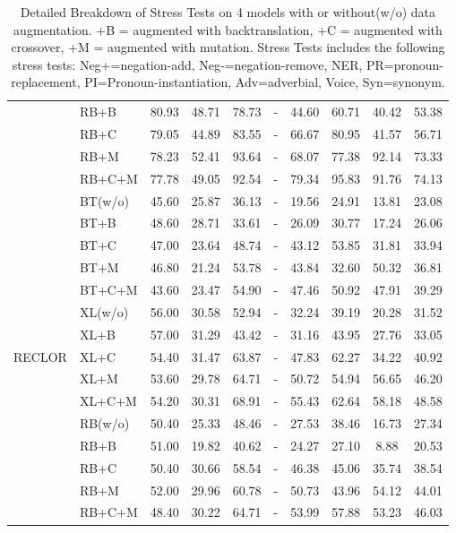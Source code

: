 \documentclass[letterpaper]{article} %
\begin{document}
\begin{table}[th]
\begin{tabular}{ll|c|ccccccc}
&RB+B&80.93 &48.71 &78.73 &-&44.60 &60.71 &40.42 &53.38 \\ 
&RB+C&79.05 &44.89 &83.55 &-&66.67 &80.95 &41.57 &56.71 \\ 
&RB+M&78.23 &52.41 &93.64 &-&68.07 &77.38 &92.14 &73.33 \\ 
&RB+C+M&77.78 &49.05 &92.54 &-&79.34 &95.83 &91.76 &74.13 \\ 
\hline
\multirow{15}{*}{RECLOR} 
&BT(w/o)&45.60 &25.87 &36.13 &-&19.56 &24.91 &13.81 &23.08\\ 
&BT+B&48.60 &28.71 &33.61 &-&26.09 &30.77 &17.24 &26.06\\ 
&BT+C&47.00 &23.64 &48.74 &-&43.12 &53.85 &31.81 &33.94\\ 
&BT+M&46.80 &21.24 &53.78 &-&43.84 &32.60 &50.32 &36.81\\ 
&BT+C+M&43.60 &23.47 &54.90 &-&47.46 &50.92 &47.91 &39.29\\ 
\cline{2-10}
&XL(w/o)&56.00 &30.58 &52.94 &-&32.24 &39.19 &20.28 &31.52\\ 
&XL+B&57.00 &31.29 &43.42 &-&31.16 &43.95 &27.76 &33.05\\ 
&XL+C&54.40 &31.47 &63.87 &-&47.83 &62.27 &34.22 &40.92\\ 
&XL+M&53.60 &29.78 &64.71 &-&50.72 &54.94 &56.65 &46.20\\ 
&XL+C+M&54.20 &30.31 &68.91 &-&55.43 &62.64 &58.18 &48.58\\ 
\cline{2-10}
&RB(w/o)&50.40 &25.33 &48.46 &-&27.53 &38.46 &16.73 &27.34\\ 
&RB+B&51.00 &19.82 &40.62 &-&24.27 &27.10 &8.88 &20.53\\ 
&RB+C&50.40 &30.66 &58.54 &-&46.38 &45.06 &35.74 &38.54\\ 
&RB+M&52.00 &29.96 &60.78 &-&50.73 &43.96 &54.12 &44.01\\ 
&RB+C+M&48.40 &30.22 &64.71 &-&53.99 &57.88 &53.23 &46.03\\ 



\bottomrule
\hline
\end{tabular}
\caption{\label{tab:results} Detailed Breakdown of Stress Tests
on 4 models with or without(w/o) data augmentation. 
+B = augmented with backtranslation,
+C = augmented with crossover, +M = augmented with mutation. 
Stress Tests includes the following stress tests: 
Neg+=negation-add, Neg-=negation-remove, NER, 
PR=pronoun-replacement, PI=Pronoun-instantiation, Adv=adverbial, Voice, Syn=synonym.}
\end{table}
\end{document}
